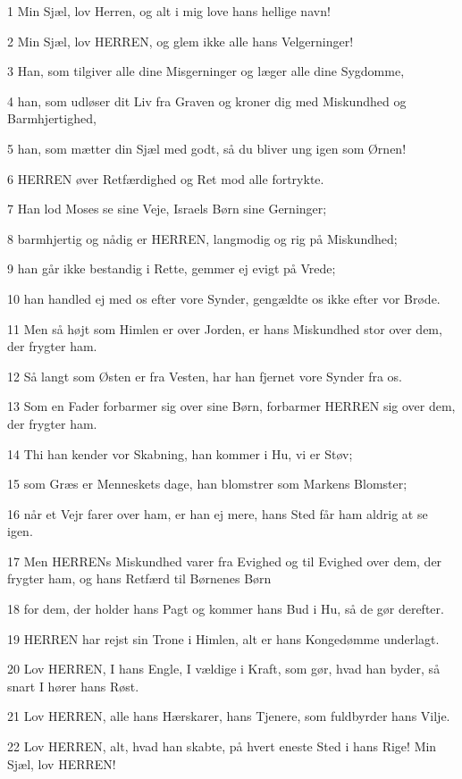 \par 1 Min Sjæl, lov Herren, og alt i mig love hans hellige navn!
\par 2 Min Sjæl, lov HERREN, og glem ikke alle hans Velgerninger!
\par 3 Han, som tilgiver alle dine Misgerninger og læger alle dine Sygdomme,
\par 4 han, som udløser dit Liv fra Graven og kroner dig med Miskundhed og Barmhjertighed,
\par 5 han, som mætter din Sjæl med godt, så du bliver ung igen som Ørnen!
\par 6 HERREN øver Retfærdighed og Ret mod alle fortrykte.
\par 7 Han lod Moses se sine Veje, Israels Børn sine Gerninger;
\par 8 barmhjertig og nådig er HERREN, langmodig og rig på Miskundhed;
\par 9 han går ikke bestandig i Rette, gemmer ej evigt på Vrede;
\par 10 han handled ej med os efter vore Synder, gengældte os ikke efter vor Brøde.
\par 11 Men så højt som Himlen er over Jorden, er hans Miskundhed stor over dem, der frygter ham.
\par 12 Så langt som Østen er fra Vesten, har han fjernet vore Synder fra os.
\par 13 Som en Fader forbarmer sig over sine Børn, forbarmer HERREN sig over dem, der frygter ham.
\par 14 Thi han kender vor Skabning, han kommer i Hu, vi er Støv;
\par 15 som Græs er Menneskets dage, han blomstrer som Markens Blomster;
\par 16 når et Vejr farer over ham, er han ej mere, hans Sted får ham aldrig at se igen.
\par 17 Men HERRENs Miskundhed varer fra Evighed og til Evighed over dem, der frygter ham, og hans Retfærd til Børnenes Børn
\par 18 for dem, der holder hans Pagt og kommer hans Bud i Hu, så de gør derefter.
\par 19 HERREN har rejst sin Trone i Himlen, alt er hans Kongedømme underlagt.
\par 20 Lov HERREN, I hans Engle, I vældige i Kraft, som gør, hvad han byder, så snart I hører hans Røst.
\par 21 Lov HERREN, alle hans Hærskarer, hans Tjenere, som fuldbyrder hans Vilje.
\par 22 Lov HERREN, alt, hvad han skabte, på hvert eneste Sted i hans Rige! Min Sjæl, lov HERREN!

